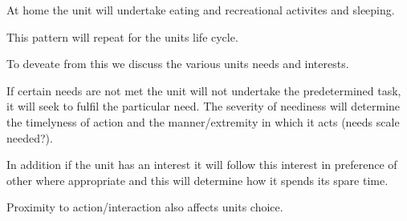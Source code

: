 At home the unit will undertake eating and recreational activites and sleeping.

This pattern will repeat for the units life cycle.

To deveate from this we discuss the various units needs and interests. 

If certain needs are not met the unit will not undertake the predetermined task, it will seek to fulfil the particular need. The severity of neediness will determine the timelyness of action and the manner/extremity in which it acts (needs scale needed?).

In addition if the unit has an interest it will follow this interest in preference of other where appropriate and this will determine how it spends its spare time.

Proximity to action/interaction also affects units choice.



